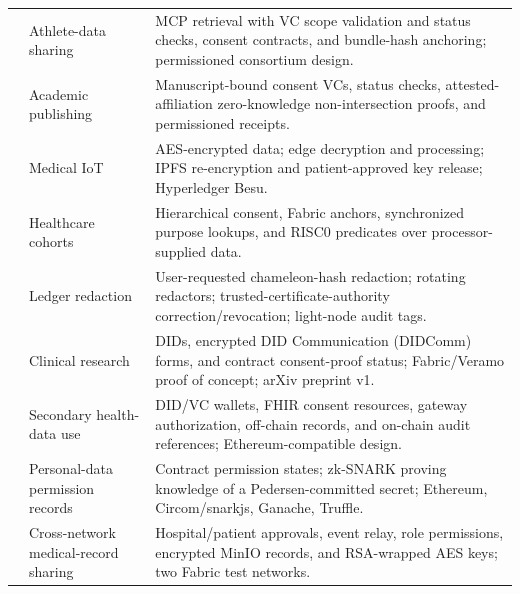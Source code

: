 \begin{longtable}{@{}>{\raggedright\arraybackslash}m{}>{\raggedright\arraybackslash}m{}>{\raggedright\arraybackslash}m{}@{}}
\addlinespace[5pt]
\cite{updateFerreira2026SportsConsent} & Athlete-data sharing & MCP retrieval with VC scope validation and status checks, consent contracts, and bundle-hash anchoring; permissioned consortium design. \\
\addlinespace[5pt]
\cite{updateAlSabahi2026AuthorshipConsent} & Academic publishing & Manuscript-bound consent VCs, status checks, attested-affiliation zero-knowledge non-intersection proofs, and permissioned receipts. \\
\addlinespace[5pt]
\cite{updateCh2026ConsentOffloading} & Medical IoT & AES-encrypted data; edge decryption and processing; IPFS re-encryption and patient-approved key release; Hyperledger Besu. \\
\addlinespace[5pt]
\cite{updateGupta2026ScalableConsent} & Healthcare cohorts & Hierarchical consent, Fabric anchors, synchronized purpose lookups, and RISC0 predicates over processor-supplied data. \\
\addlinespace[5pt]
\cite{updateMiao2026PermissionSupervision} & Ledger redaction & User-requested chameleon-hash redaction; rotating redactors; trusted-certificate-authority correction/revocation; light-node audit tags. \\
\addlinespace[5pt]
\cite{updateNaghmouchi2026ClinConNet} & Clinical research & DIDs, encrypted DID Communication (DIDComm) forms, and contract consent-proof status; Fabric/Veramo proof of concept; arXiv preprint v1. \\
\addlinespace[5pt]
\cite{updatePhuyal2026Architecture} & Secondary health-data use & DID/VC wallets, FHIR consent resources, gateway authorization, off-chain records, and on-chain audit references; Ethereum-compatible design. \\
\addlinespace[5pt]
\cite{updateScaramuzza2026ZKConsent} & Personal-data permission records & Contract permission states; zk-SNARK proving knowledge of a Pedersen-committed secret; Ethereum, Circom/snarkjs, Ganache, Truffle. \\
\addlinespace[5pt]
\cite{updateHemlata2026DualCare} & Cross-network medical-record sharing & Hospital/patient approvals, event relay, role permissions, encrypted MinIO records, and RSA-wrapped AES keys; two Fabric test networks. \\
\end{longtable}

